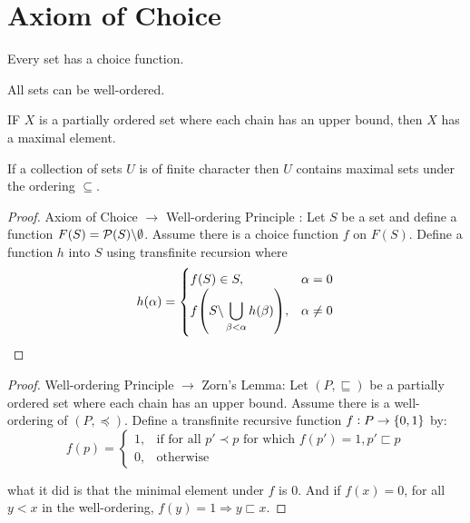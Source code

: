 \section{Axiom of Choice}

\begin{theorem}
    Every set has a choice function.
\end{theorem}

\begin{theorem}
    All sets can be well-ordered.
\end{theorem}

\begin{theorem}
    IF $X$ is a partially ordered set where each chain has an upper bound, then $X$ has a maximal element.
\end{theorem}

\begin{theorem}
    If a collection of sets $U$ is of finite character then $U$ contains maximal sets under the ordering $\subseteq$.
\end{theorem}

\begin{proof}
Axiom of Choice $\rightarrow$ Well-ordering Principle :  Let $S$ be a set and define a function $F(S) = \powerset{S} \backslash \emptyset$. Assume there is a choice function $f$ on $F(S)$. Define a function $h$ into $S$ using transfinite recursion where
    \begin{equation}
        h(\alpha) = \begin{cases}
            f(S) \in S, & \alpha = 0 \\
            f\mleft( \displaystyle S \backslash \bigcup_{\beta < \alpha} h(\beta) \mright), & \alpha \neq 0
        \end{cases}
    \end{equation}
\end{proof}    
    
\begin{proof}    
Well-ordering Principle $\rightarrow$ Zorn's Lemma: Let $(P, \sqsubseteq)$ be a partially ordered set where each chain has an upper bound. Assume there is a well-ordering of $(P, \preceq)$. Define a transfinite recursive function $f: P \rightarrow \set{0,1}$ by:
    \begin{equation}
        f(p) = \begin{cases}
            1, & \text{if for all } p' \prec p \text{ for which } f(p') = 1, p' \sqsubset p \\
            0, & \text{otherwise}
        \end{cases}
    \end{equation}

what it did is that the minimal element under $f$ is $0$. And if $f(x) = 0$, for all $y < x$ in the well-ordering, $f(y) = 1 \Rightarrow y \sqsubset x$.
\end{proof}


